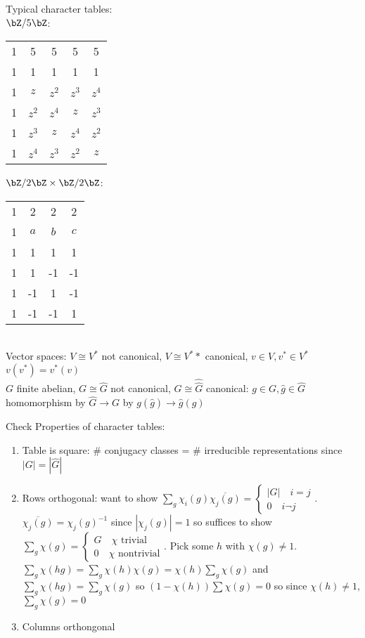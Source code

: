 \noindent
Typical character tables: \\
$\bZ/5\bZ$: 
\begin{tabular}{ | c c c c c|}
    1 & 5 & 5 & 5 & 5 \\ 
    1 & 1 & 1 & 1 & 1 \\ \hline 
    1 & $z$ & $z^2$ & $z^3$ & $z^4$ \\ 
    1 & $z^2$ & $z^4$ & $z$ & $z^3$ \\ 
    1 & $z^3$ & $z$ & $z^4$ & $z^2$ \\
    1 & $z^4$ & $z^3$ & $z^2$ & $z$ \\  \hline 
\end{tabular} \quad
$\bZ/2\bZ \times \bZ/2\bZ$: 
\begin{tabular}{|c c c c|}
    1 & 2 & 2 & 2 \\ 
    1 & $a$ & $b$ & $c$ \\ \hline     
    1 & 1 & 1 & 1 \\ 
    1 & 1 & -1 & -1 \\ 
    1 & -1 & 1 & -1 \\ 
    1 & -1 & -1 & 1 
\end{tabular} \\

\noindent
Vector spaces: $V \cong V^*$ not canonical, $V \cong V^**$ canonical, $v \in V, v^* \in V^*$ $v(v^*) = v^*(v)$ \\
$G$ finite abelian, $G \cong \hat{G}$ not canonical, $G \cong \hat{\hat{G}}$ canonical: $g \in G, \hat{g} \in \hat{G}$ homomorphism by $\hat{G} \to G$ by $g(\hat{g}) \to \hat{g}(g)$ 

\noindent
Check Properties of character tables: 
\begin{enumerate}
    \item Table is square: \# conjugacy classes = \# irreducible representations since $|G| = |\hat{G}|$ 
    \item Rows orthogonal: want to show $\sum_{g} \chi_i(g)\overline{\chi_j(g)} = \begin{cases} |G| \quad i=j \\ 0 \quad i \neg j \end{cases}$. $\overline{\chi_j(g)} = \chi_j(g)^{-1}$ since $|\chi_j(g)|=1$ so suffices to show $\sum_{g} \chi(g) = \begin{cases} G \quad \chi \text{ trivial} \\ 0 \quad \chi \text{ nontrivial} \end{cases}$. Pick some $h$ with $\chi(g) \neq 1$. $\sum_{g} \chi(hg) = \sum_{g} \chi(h)\chi(g) = \chi(h)\sum_{g}\chi(g)$ and $\sum_{g}\chi(hg) = \sum_{g}\chi(g)$ so $(1 - \chi(h))\sum \chi(g)=0$ so since $\chi(h) \neq 1$, $\sum_g \chi(g)=0$ 
    \item Columns orthongonal 
\end{enumerate}

